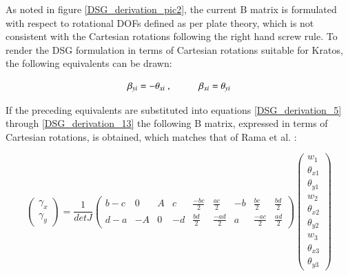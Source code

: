 As noted in figure \ref{DSG_derivation_pic2}, the current B matrix is formulated with respect to rotational DOFs defined as per plate theory, which is not consistent with the Cartesian rotations following the right hand screw rule. To render the DSG formulation in terms of Cartesian rotations suitable for Kratos, the following equivalents can be drawn:

\begin{equation} 
\beta_{yi} = -\theta_{xi}\ ,
\hspace{10mm}
\beta_{xi} = \theta_{yi}
\label{DSG_derivation_16}
\end{equation}

If the preceding equivalents are substituted into equations \ref{DSG_derivation_5} through \ref{DSG_derivation_13} the following B matrix, expressed in terms of Cartesian rotations, is obtained, which matches that of Rama et al. \cite{Ram16}:

\begin{equation} 
\begin{pmatrix}
\gamma_x \\
\gamma_y 
\end{pmatrix}
=
\frac{1}{detJ}
\begin{pmatrix}
b-c & 0 & A & c & \frac{-bc}{2} & \frac{ac}{2} & -b & \frac{bc}{2} & \frac{bd}{2} \\
d-a & -A & 0 & -d & \frac{bd}{2} & \frac{-ad}{2} & a & \frac{-ac}{2} & \frac{ad}{2}
\end{pmatrix}
\begin{pmatrix}
w_1 \\
\theta_{x1} \\
\theta_{y1} \\
w_2 \\
\theta_{x2} \\
\theta_{y2} \\
w_3 \\
\theta_{x3} \\
\theta_{y3} 
\end{pmatrix}
\label{DSG_derivation_17}
\end{equation}
